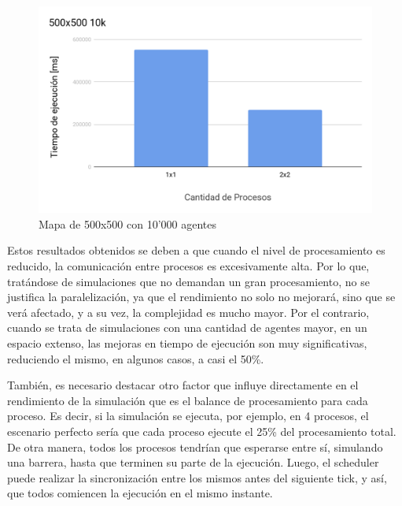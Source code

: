 \begin{figure}[H]
	\centering
	\includegraphics{Rendimiento4.png}
	\caption{Mapa de 500x500 con 10'000 agentes}
\end{figure}

Estos resultados obtenidos se deben a que cuando el nivel de
procesamiento es reducido, la comunicación entre procesos es
excesivamente alta. Por lo que, tratándose de simulaciones que no
demandan un gran procesamiento, no se justifica la paralelización, ya
que el rendimiento no solo no mejorará, sino que se verá afectado, y a
su vez, la complejidad es mucho mayor. Por el contrario, cuando se trata
de simulaciones con una cantidad de agentes mayor, en un espacio
extenso, las mejoras en tiempo de ejecución son muy significativas,
reduciendo el mismo, en algunos casos, a casi el 50\%.

También, es necesario destacar otro factor que influye directamente en
el rendimiento de la simulación que es el balance de procesamiento para
cada proceso. Es decir, si la simulación se ejecuta, por ejemplo, en 4
procesos, el escenario perfecto sería que cada proceso ejecute el 25\%
del procesamiento total. De otra manera, todos los procesos tendrían que
esperarse entre sí, simulando una barrera, hasta que terminen su parte
de la ejecución. Luego, el scheduler puede realizar la sincronización
entre los mismos antes del siguiente tick, y así, que todos comiencen la
ejecución en el mismo instante.
